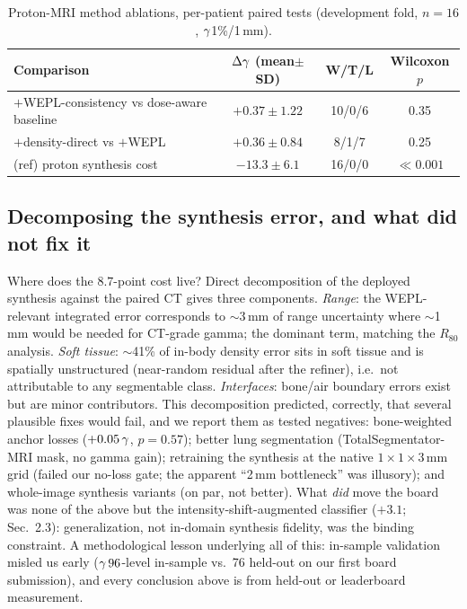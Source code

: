 \documentclass{llncs}
\begin{document}
\begin{table}[h]\centering
\caption{Proton-MRI method ablations, per-patient paired tests (development fold, $n=16$,
$\gamma$1\%/1\,mm).}\label{tab:abl}
\begin{tabular}{@{}lccc@{}}\toprule
Comparison & $\Delta\gamma$ (mean$\pm$SD) & W/T/L & Wilcoxon $p$\\\midrule
$+$WEPL-consistency vs dose-aware baseline & $+0.37\pm1.22$ & 10/0/6 & 0.35\\
$+$density-direct vs $+$WEPL & $+0.36\pm0.84$ & 8/1/7 & 0.25\\
(ref) proton synthesis cost & $\bm{-13.3\pm6.1}$ & 16/0/0 & $\bm{\ll0.001}$\\\bottomrule
\end{tabular}\end{table}

\subsection{Decomposing the synthesis error, and what did not fix it}
Where does the $8.7$-point cost live? Direct decomposition of the deployed synthesis against the
paired CT gives three components. \emph{Range}: the WEPL-relevant integrated error corresponds
to $\sim$3\,mm of range uncertainty where $\sim$1\,mm would be needed for CT-grade gamma; the
dominant term, matching the $R_{80}$ analysis. \emph{Soft tissue}: $\sim$41\% of in-body
density error sits in soft tissue and is spatially unstructured (near-random residual after the
refiner), i.e.\ not attributable to any segmentable class. \emph{Interfaces}: bone/air
boundary errors exist but are minor contributors. This decomposition predicted, correctly, that
several plausible fixes would fail, and we report them as tested negatives: bone-weighted
anchor losses ($+0.05\,\gamma$, $p{=}0.57$); better lung segmentation (TotalSegmentator-MRI mask,
no gamma gain); retraining the synthesis at the native $1{\times}1{\times}3$\,mm grid (failed
our no-loss gate; the apparent ``2\,mm bottleneck'' was illusory); and whole-image synthesis
variants (on par, not better). What \emph{did} move the board was none of the above but the
intensity-shift-augmented classifier ($+3.1$; Sec.~2.3): generalization, not in-domain
synthesis fidelity, was the binding constraint. A methodological lesson underlying all of this:
in-sample validation misled us early ($\gamma\,96$-level in-sample vs.\ 76 held-out on our first
board submission), and every conclusion above is from held-out or leaderboard measurement.
\end{document}

